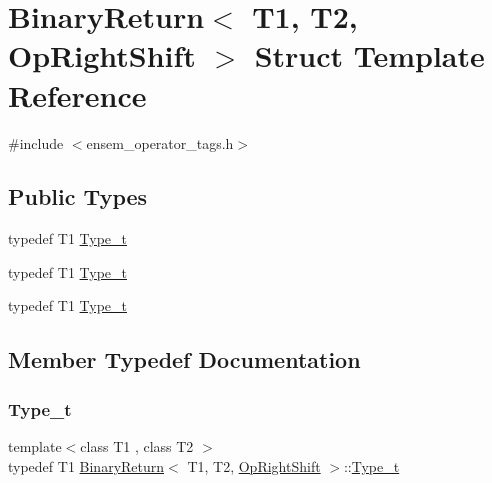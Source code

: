 \hypertarget{structBinaryReturn_3_01T1_00_01T2_00_01OpRightShift_01_4}{}\section{Binary\+Return$<$ T1, T2, Op\+Right\+Shift $>$ Struct Template Reference}
\label{structBinaryReturn_3_01T1_00_01T2_00_01OpRightShift_01_4}


{\ttfamily \#include $<$ensem\+\_\+operator\+\_\+tags.\+h$>$}

\subsection*{Public Types}
\begin{DoxyCompactItemize}
\item 
typedef T1 \mbox{\hyperlink{structBinaryReturn_3_01T1_00_01T2_00_01OpRightShift_01_4_a669ff609f8117f57e60c22cb953ff2d6}{Type\+\_\+t}}
\item 
typedef T1 \mbox{\hyperlink{structBinaryReturn_3_01T1_00_01T2_00_01OpRightShift_01_4_a669ff609f8117f57e60c22cb953ff2d6}{Type\+\_\+t}}
\item 
typedef T1 \mbox{\hyperlink{structBinaryReturn_3_01T1_00_01T2_00_01OpRightShift_01_4_a669ff609f8117f57e60c22cb953ff2d6}{Type\+\_\+t}}
\end{DoxyCompactItemize}


\subsection{Member Typedef Documentation}
\mbox{\label{structBinaryReturn_3_01T1_00_01T2_00_01OpRightShift_01_4_a669ff609f8117f57e60c22cb953ff2d6}} 
\subsubsection{\texorpdfstring{Type\_t}{Type\_t}\hspace{0.1cm}{\footnotesize\ttfamily [1/3]}}
{\footnotesize\ttfamily template$<$class T1 , class T2 $>$ \\
typedef T1 \mbox{\hyperlink{structBinaryReturn}{Binary\+Return}}$<$ T1, T2, \mbox{\hyperlink{structOpRightShift}{Op\+Right\+Shift}} $>$\+::\mbox{\hyperlink{structBinaryReturn_3_01T1_00_01T2_00_01OpRightShift_01_4_a669ff609f8117f57e60c22cb953ff2d6}{Type\+\_\+t}}}

